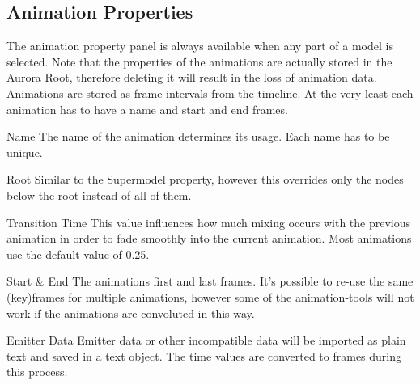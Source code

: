\subsection{Animation Properties}


\begin{minipage}[t]{0.55\textwidth}
    The animation property panel is always available when any part of a model is selected. Note 
    that the properties of the animations are actually stored in the Aurora Root, therefore deleting it 
    will result in the loss of animation data.\\
    
    Animations are stored as frame intervals from the timeline. At the very least each animation has to 
    have a name and start and end frames.
    
    \begin{propertyAurora}{Name}
        The name of the animation determines its usage. Each name has to be unique.
    \end{propertyAurora}
    
    \begin{propertyAurora}{Root}
        Similar to the Supermodel property, however this overrides only the 
        nodes below the root instead of all of them.
    \end{propertyAurora}
    
    \begin{propertyAurora}{Transition Time}
        This value influences how much mixing occurs with the previous animation in order to 
        fade smoothly into the current animation. Most animations use the default value of 0.25.
    \end{propertyAurora}    
\end{minipage}\hfill
\begin{minipage}[t]{0.4\textwidth}
    \centering{}
    \label{fig1}
\end{minipage}

\begin{propertyAurora}{Start \& End}
    The animations first and last frames. It's possible to re-use the same (key)frames for 
    multiple animations, however some of the animation-tools will not work if the animations are 
    convoluted in this way.
\end{propertyAurora}

\begin{propertyAurora}{Emitter Data}
    Emitter data or other incompatible data will be imported as plain text and saved in a text object. The
    time values are converted to frames during this process.
\end{propertyAurora}

